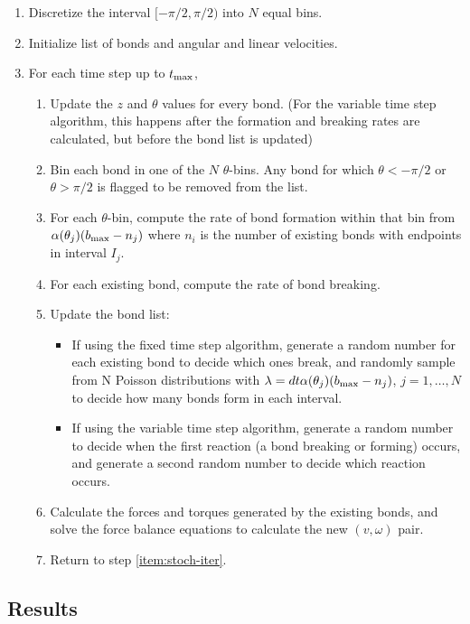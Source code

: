 \documentclass{article}
\newcommand{\tn}{\textnormal}
\begin{document}
\begin{enumerate}
\item Discretize the interval $[-\pi/2, \pi/2)$ into $N$ equal bins.
\item Initialize list of bonds and angular and linear velocities. 
\item For each time step up to $t_\tn{max}$, \label{item:stoch-iter}
  \begin{enumerate}
  \item Update the $z$ and $\theta$ values for every bond. (For the
    variable time step algorithm, this happens after the formation and
    breaking rates are calculated, but before the bond list is updated)
  \item Bin each bond in one of the $N$ $\theta$-bins. Any bond for
    which $\theta < -\pi/2$ or $\theta > \pi/2$ is flagged to be
    removed from the list.
  \item For each $\theta$-bin, compute the rate of bond formation
    within that bin from $\alpha(\theta_j) (b_\tn{max} - n_j)$ where
    $n_i$ is the number of existing bonds with endpoints in interval
    $I_j$.
  \item For each existing bond, compute the rate of bond breaking.
  \item Update the bond list:
    \begin{itemize}
    \item If using the fixed time step algorithm, generate a random
      number for each existing bond to decide which ones break, and
      randomly sample from N Poisson distributions with $\lambda = dt
      \alpha(\theta_j) (b_\tn{max} - n_j)$, $j = 1, \hdots, N$ to
      decide how many bonds form in each interval.
    \item If using the variable time step algorithm, generate a random
      number to decide when the first reaction (a bond breaking or
      forming) occurs, and generate a second random number to decide
      which reaction occurs.
    \end{itemize}
  \item Calculate the forces and torques generated by the existing
    bonds, and solve the force balance equations to calculate the new
    $(v, \omega)$ pair.
  \item Return to step \ref{item:stoch-iter}.
  \end{enumerate}
\end{enumerate}

\subsection{Results}
\label{sec:results}
\end{document}
